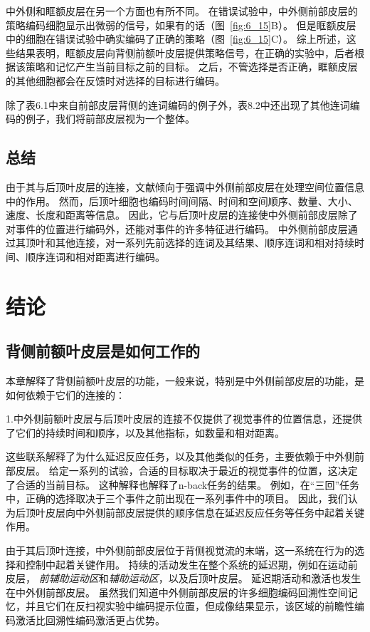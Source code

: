中外侧和眶额皮层在另一个方面也有所不同。
在错误试验中，中外侧前部皮层的策略编码细胞显示出微弱的信号，如果有的话（图~\ref{fig:6_15}B）。
但是眶额皮层中的细胞在错误试验中确实编码了正确的策略（图~\ref{fig:6_15}C）。
综上所述，这些结果表明，眶额皮层向背侧前额叶皮层提供策略信号，在正确的实验中，后者根据该策略和记忆产生当前目标之前的目标。
之后，不管选择是否正确，眶额皮层的其他细胞都会在反馈时对选择的目标进行编码。


除了表6.1中来自前部皮层背侧的连词编码的例子外，表8.2中还出现了其他连词编码的例子，我们将前部皮层视为一个整体。



\subsection{总结}

由于其与后顶叶皮层的连接，文献倾向于强调中外侧前部皮层在处理空间位置信息中的作用。
然而，后顶叶细胞也编码时间间隔、时间和空间顺序、数量、大小、速度、长度和距离等信息。
因此，它与后顶叶皮层的连接使中外侧前部皮层除了对事件的位置进行编码外，还能对事件的许多特征进行编码。
中外侧前部皮层通过其顶叶和其他连接，对一系列先前选择的连词及其结果、顺序连词和相对持续时间、顺序连词和相对距离进行编码。



\section{结论}

\subsection{背侧前额叶皮层是如何工作的}

本章解释了背侧前额叶皮层的功能，一般来说，特别是中外侧前部皮层的功能，是如何依赖于它们的连接的：
\par

1.中外侧前额叶皮层与后顶叶皮层的连接不仅提供了视觉事件的位置信息，还提供了它们的持续时间和顺序，以及其他指标，如数量和相对距离。


这些联系解释了为什么延迟反应任务，以及其他类似的任务，主要依赖于中外侧前部皮层。
给定一系列的试验，合适的目标取决于最近的视觉事件的位置，这决定了合适的当前目标。
这种解释也解释了n-back任务的结果。
例如，在“三回”任务中，正确的选择取决于三个事件之前出现在一系列事件中的项目。
因此，我们认为后顶叶皮层向中外侧前部皮层提供的顺序信息在延迟反应任务等任务中起着关键作用。


由于其后顶叶连接，中外侧前部皮层位于背侧视觉流的末端，这一系统在行为的选择和控制中起着关键作用。
持续的活动发生在整个系统的延迟期，例如在运动前皮层\cite{wise1985primate}， \textit{前辅助运动区}和\textit{辅助运动区}\cite{shima2000neuronal}，以及后顶叶皮层\cite{kalaska1995deciding}。
延迟期活动和激活也发生在中外侧前部皮层。
虽然我们知道中外侧前部皮层的许多细胞编码回溯性空间记忆\cite{genovesio2006neuronal}，并且它们在反扫视实验中编码提示位置\cite{funahashi1993prefrontal}，但成像结果显示，该区域的前瞻性编码激活比回溯性编码激活更占优势。
\par


